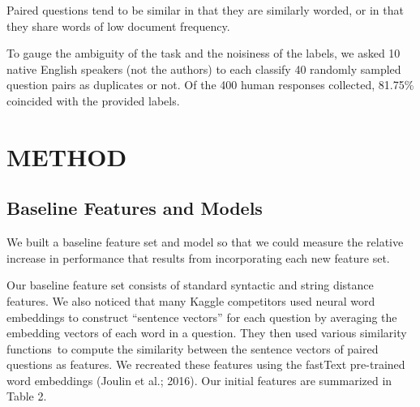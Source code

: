 \documentclass[letterpaper, 10 pt, conference]{ieeeconf}  %
\begin{document}
Paired questions tend to be similar in that they are similarly worded, or in that they share words of low document frequency.

To gauge the ambiguity of the task and the noisiness of the labels, we asked 10 native English speakers (not the authors) to each classify 40 randomly sampled question pairs as duplicates or not. Of the 400 human responses collected, 81.75\% coincided with the provided labels.


\section{METHOD}


\subsection{Baseline Features and Models} 

We built a baseline feature set and model so that we could measure the relative increase in performance that results from incorporating each new feature set.

Our baseline feature set consists of standard syntactic and string distance features\footnotemark . We also noticed that many Kaggle competitors used neural word embeddings to construct “sentence vectors” for each question by averaging the embedding vectors of each word in a question. They then used various similarity functions\footnotemark \ to compute the similarity between the sentence vectors of paired questions as features. We recreated these features using the fastText pre-trained word embeddings (Joulin et al.; 2016). Our initial features are summarized in Table 2.
\end{document}
